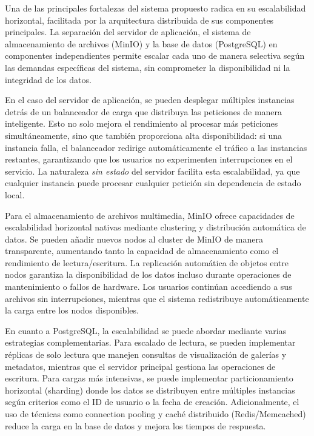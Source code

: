 Una de las principales fortalezas del sistema propuesto radica en su escalabilidad horizontal, facilitada por la arquitectura distribuida de sus componentes principales. La separación del servidor de aplicación, el sistema de almacenamiento de archivos (MinIO) y la base de datos (PostgreSQL) en componentes independientes permite escalar cada uno de manera selectiva según las demandas específicas del sistema, sin comprometer la disponibilidad ni la integridad de los datos.

En el caso del servidor de aplicación, se pueden desplegar múltiples instancias detrás de un balanceador de carga que distribuya las peticiones de manera inteligente. Esto no solo mejora el rendimiento al procesar más peticiones simultáneamente, sino que también proporciona alta disponibilidad: si una instancia falla, el balanceador redirige automáticamente el tráfico a las instancias restantes, garantizando que los usuarios no experimenten interrupciones en el servicio. La naturaleza \textit{sin estado} del servidor facilita esta escalabilidad, ya que cualquier instancia puede procesar cualquier petición sin dependencia de estado local.

Para el almacenamiento de archivos multimedia, MinIO ofrece capacidades de escalabilidad horizontal nativas mediante clustering y distribución automática de datos. Se pueden añadir nuevos nodos al cluster de MinIO de manera transparente, aumentando tanto la capacidad de almacenamiento como el rendimiento de lectura/escritura. La replicación automática de objetos entre nodos garantiza la disponibilidad de los datos incluso durante operaciones de mantenimiento o fallos de hardware. Los usuarios continúan accediendo a sus archivos sin interrupciones, mientras que el sistema redistribuye automáticamente la carga entre los nodos disponibles.

En cuanto a PostgreSQL, la escalabilidad se puede abordar mediante varias estrategias complementarias. Para escalado de lectura, se pueden implementar réplicas de solo lectura que manejen consultas de visualización de galerías y metadatos, mientras que el servidor principal gestiona las operaciones de escritura. Para cargas más intensivas, se puede implementar particionamiento horizontal (sharding) donde los datos se distribuyen entre múltiples instancias según criterios como el ID de usuario o la fecha de creación. Adicionalmente, el uso de técnicas como connection pooling y caché distribuido (Redis/Memcached) reduce la carga en la base de datos y mejora los tiempos de respuesta.

